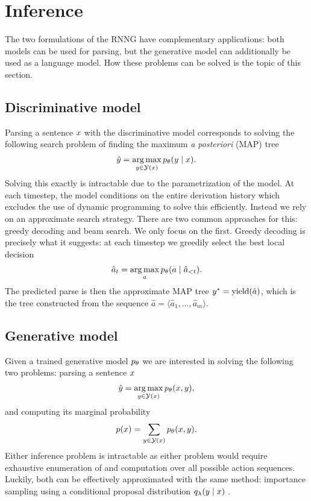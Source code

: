 \section{Inference}
  The two formulations of the RNNG have complementary applications: both models can be used for parsing, but the generative model can additionally be used as a language model. How these problems can be solved is the topic of this section.

  \subsection{Discriminative model}
    Parsing a sentence $x$ with the discriminative model corresponds to solving the following search problem of finding the maximum \textit{a posteriori} (MAP) tree
    \begin{align*}
      \hat{y} = \operatorname*{arg\,max}_{ y \in \mathcal{Y}(x) } p_{\theta}(y \mid x).
    \end{align*}
    Solving this exactly is intractable due to the parametrization of the model. At each timestep, the model conditions on the entire derivation history which excludes the use of dynamic programming to solve this efficiently. Instead we rely on an approximate search strategy. There are two common approaches for this: greedy decoding and beam search. We only focus on the first. Greedy decoding is precisely what it suggests: at each timestep we greedily select the best local decision
    \begin{align*}
      \hat{a}_t = \operatorname*{arg\,max}_{a} p_{\theta}(a \mid \hat{a}_{< t}).
    \end{align*}
    The predicted parse is then the approximate MAP tree $y^* = \text{yield}(\hat{a})$, which is the tree constructed from the sequence $\hat{a} = \langle \hat{a}_1, \dots, \hat{a}_m \rangle$.

  \subsection{Generative model}
    Given a trained generative model $p_{\theta}$ we are interested in solving the following two problems: parsing a sentence $x$
    \begin{align*}
      \hat{y} = \operatorname*{arg\,max}_{ y \in \mathcal{Y}(x) } p_{\theta}(x, y),
    \end{align*}
    and computing its marginal probability
    \begin{align*}
      p(x) = \sum_{ y \in \mathcal{Y}(x) } p_{\theta}(x, y).
    \end{align*}
    Either inference problem is intractable as either problem would require exhaustive enumeration of and computation over all possible action sequences.  Luckily, both can be effectively approximated with the same method: importance sampling using a conditional proposal distribution $q_{\lambda}(y \mid x)$ \citep{dyer2016rnng}.

